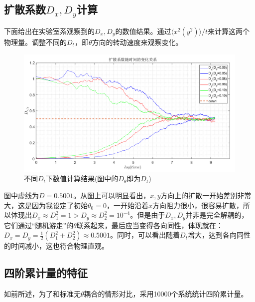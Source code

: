 \documentclass[UTF8]{ctexart}
\begin{document}
	\newpage
	\subsection{扩散系数$D_x,D_y$计算}
	
	\begin{flushleft}
		下面给出在实验室系观察到的$D_x,D_y$的数值结果。通过$\langle x^2(y^2)\rangle/t$来计算这两个物理量。调整不同的$D_t$，即$\theta$方向的转动速度来观察变化。
	\end{flushleft}
	
	\begin{figure}[H]
		\centering  %
		\includegraphics[width=6in]{D}
		\caption{不同$D_t$下数值计算结果(图中的$D_\theta$即为$D_t$)}
	\end{figure}

	\begin{flushleft}
		
		图中虚线为$D=0.5001$。从图上可以明显看出，$x,y$方向上的扩散一开始差别非常大，这是因为我设定了初始$\theta_0=0$，一开始沿着$x$方向阻力很小，很容易扩散，所以体现出$D_x\approx D_1^2=1>D_y\approx D_2^2=10^{-4}$。但是由于$D_x,D_y$并非是完全解耦的，它们通过“随机游走”的$\theta$联系起来，最后应当变得各向同性，体现就在：
		$D_x=D_y=\frac{1}{2}(D_1^2+D_2^2)\approx0.5001$。同时，可以看出随着$D_t$增大，达到各向同性的时间减小，这也符合物理直观。
	\end{flushleft}


	\subsection{四阶累计量的特征}
	
	如前所述，为了和标准无$\theta$耦合的情形对比，采用10000个系统统计四阶累计量。
	
\end{document}
